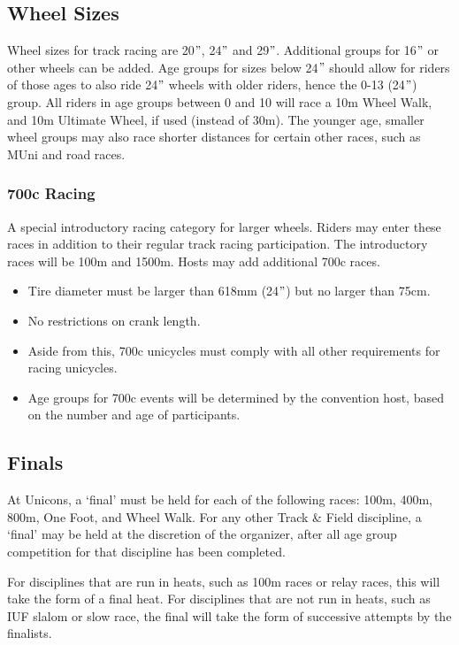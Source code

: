\subsection{Wheel Sizes}
Wheel sizes for track racing are 20$"$, 24$"$ and 29$"$.
Additional groups for 16$"$ or other wheels can be added.
Age groups for sizes below 24$"$ should allow for riders of those ages to also ride 24$"$ wheels with older riders, hence the 0-13 (24$"$) group.
All riders in age groups between 0 and 10 will race a 10m Wheel Walk, and 10m Ultimate Wheel, if used (instead of 30m).
The younger age, smaller wheel groups may also race shorter distances for certain other races, such as MUni and road races.

\subsubsection{700c Racing}
A special introductory racing category for larger wheels.
Riders may enter these races in addition to their regular track racing participation.
The introductory races will be 100m and 1500m.
Hosts may add additional 700c races.
\begin{itemize}
\item Tire diameter must be larger than 618mm (24$"$) but no larger than 75cm.
\item No restrictions on crank length.
\item Aside from this, 700c unicycles must comply with all other requirements for racing unicycles.
\item Age groups for 700c events will be determined by the convention host, based on the number and age of participants.
\end{itemize}

\subsection{Finals}
At Unicons, a `final' must be held for each of the following races: 100m, 400m, 800m, One Foot, and Wheel Walk. 
For any other Track & Field discipline, a `final' may be held at the discretion of the organizer, after all age group competition for that discipline has been completed.

For disciplines that are run in heats, such as 100m races or relay races, this will take the form of a final heat. 
For disciplines that are not run in heats, such as IUF slalom or slow race, the final will take the form of successive attempts by the finalists.

